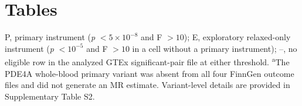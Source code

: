 \clearpage
\section*{Tables}

\begin{table}[H]
\centering
\caption{Cis-eQTL instrument availability across 19 genes and three GTEx v8 tissues.}
\label{tab:1}
\footnotesize
{}

\vspace{4pt}
\noindent\footnotesize P, primary instrument (\textit{p} $<5\times10^{-8}$ and F $>10$); E, exploratory relaxed-only instrument (\textit{p} $<10^{-5}$ and F $>10$ in a cell without a primary instrument); --, no eligible row in the analyzed GTEx significant-pair file at either threshold. \textsuperscript{a}The PDE4A whole-blood primary variant was absent from all four FinnGen outcome files and did not generate an MR estimate. Variant-level details are provided in Supplementary Table S2.
\end{table}
\clearpage
